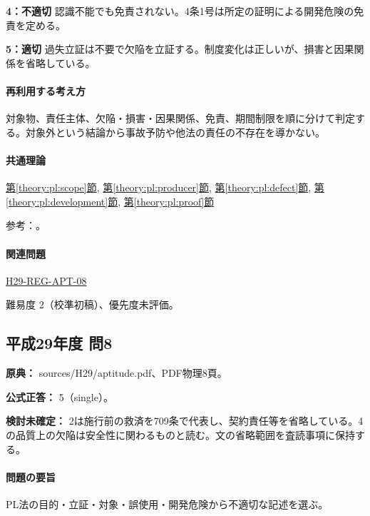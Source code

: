 \noindent\textbf{4：不適切} 認識不能でも免責されない。4条1号は所定の証明による開発危険の免責を定める。\par

\noindent\textbf{5：適切} 過失立証は不要で欠陥を立証する。制度変化は正しいが、損害と因果関係を省略している。\par

\paragraph{再利用する考え方} 対象物、責任主体、欠陥・損害・因果関係、免責、期間制限を順に分けて判定する。対象外という結論から事故予防や他法の責任の不存在を導かない。

\paragraph{共通理論} \hyperref[theory:pl:scope]{第\ref*{theory:pl:scope}節}, \hyperref[theory:pl:producer]{第\ref*{theory:pl:producer}節}, \hyperref[theory:pl:defect]{第\ref*{theory:pl:defect}節}, \hyperref[theory:pl:development]{第\ref*{theory:pl:development}節}, \hyperref[theory:pl:proof]{第\ref*{theory:pl:proof}節}

\par 参考：\cite{pl_statute,pl_qa,pl_definitions2018}。

\paragraph{関連問題} \hyperref[q:h29-reg-apt-08]{H29-REG-APT-08}

\par 難易度 2（校準初稿）、優先度未評価。

\subsection{平成29年度 問8}
\label{q:h29-reg-apt-08}

\noindent\textbf{原典：} sources/H29/aptitude.pdf、PDF物理8頁。

\textbf{公式正答：} 5（single）。

\par\textbf{検討未確定：} 2は施行前の救済を709条で代表し、契約責任等を省略している。4の品質上の欠陥は安全性に関わるものと読む。文の省略範囲を査読事項に保持する。

\paragraph{問題の要旨} PL法の目的・立証・対象・誤使用・開発危険から不適切な記述を選ぶ。

